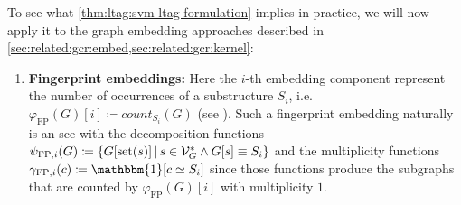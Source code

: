 To see what \cref{thm:ltag:svm-ltag-formulation} implies in practice, we will now apply it to the graph embedding approaches described in \cref{sec:related:gcr:embed,sec:related:gcr:kernel}:
\begin{enumerate}[label=\textbf{\arabic*.},ref={\arabic*}]
	\item \textbf{Fingerprint embeddings:}\label{itm:ltag:fingerprint-lta-formulation}
		Here the $i$-th embedding component represent the number of occurrences of a substructure $S_i$, i.e.\ ${\varphi}_{\text{FP}}(G)[i] \coloneqq \mathit{count}_{S_i}(G)$ (see ).
		Such a fingerprint embedding naturally is an \ac{sce} with the decomposition functions $\psi_{\text{FP}, i}(G) \coloneqq \{ G[\operatorname{set}(s)]\, |\, s \in \mathcal{V}_G^{*} \land G[s] \equiv S_i \}$ and the multiplicity functions $\gamma_{\text{FP}, i}(c) \coloneqq \mathbbm{1}[c \simeq S_i]$ since those functions produce the subgraphs that are counted by ${\varphi}_{\text{FP}}(G)[i]$ with multiplicity $1$. %


\end{enumerate}
